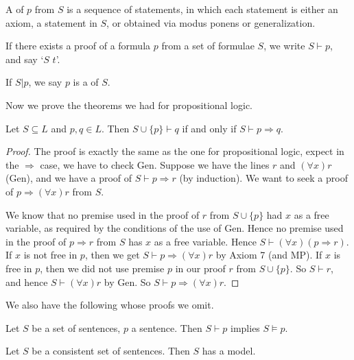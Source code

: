 \documentclass[a4paper, 10pt, twocolumn]{amsart}
\begin{document}
\begin{definition}[Proof]
  A  of $p$ from $S$ is a sequence of statements, in which each statement is either an axiom, a statement in $S$, or obtained via modus ponens or generalization.
\end{definition}

\begin{definition}
  If there exists a proof of a formula $p$ from a set of formulae $S$, we write $S \vdash p$, and say `$S$  $t$'.
\end{definition}

\begin{definition}[Theorem]
  If $S \lvert p$, we say $p$ is a  of $S$.  
\end{definition}

Now we prove the theorems we had for propositional logic.

\begin{proposition}
  Let $S \subseteq L$ and $p, q \in L$. Then $S \cup \{p\} \vdash q$ if and only if $S \vdash p \Rightarrow q$.
\end{proposition}
\begin{proof}
  The proof is exactly the same as the one for propositional logic, expect in the $\Rightarrow$ case, we have to check Gen. Suppose we have the lines $r$ and $(\forall x) r$ (Gen), and we have a proof of $S\vdash p \Rightarrow r$ (by induction). We want to seek a proof of $p \Rightarrow (\forall x) r$ from $S$.

  We know that no premise used in the proof of $r$ from $S \cup \{p\}$ had $x$ as a free variable, as required by the conditions of the use of Gen. Hence no premise used in the proof of $p\Rightarrow r$ from $S$ has $x$ as a free variable. Hence $S \vdash (\forall x)(p\Rightarrow r)$. If $x$ is not free in $p$, then we get $S \vdash p \Rightarrow (\forall x)r$ by Axiom 7 (and MP). If $x$ is free in $p$, then we did not use premise $p$ in our proof $r$ from $S \cup \{p\}$. So $S \vdash r$, and hence $S \vdash (\forall x) r$ by Gen. So $S \vdash p \Rightarrow (\forall x) r$.
\end{proof}


We also have the following whose proofs we omit.

\begin{proposition}
  Let $S$ be a set of sentences, $p$ a sentence. Then $S \vdash p$ implies $S \models p$.
\end{proposition}
\begin{theorem}
  Let $S$ be a consistent set of sentences. Then $S$ has a model.
\end{theorem}
\end{document}
